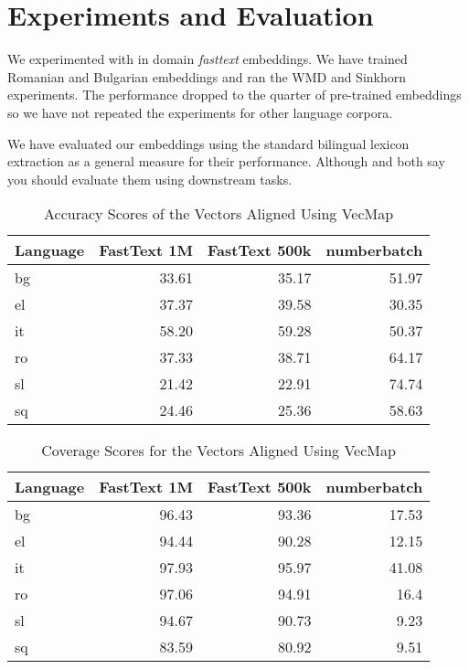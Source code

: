 
\chapter{Experiments and Evaluation}%
\label{chap:experiments_and_evaluation}

We experimented with in domain \emph{fasttext} embeddings.
We have trained Romanian and Bulgarian embeddings and ran the WMD and Sinkhorn experiments.
The performance dropped to the quarter of pre-trained embeddings so we have not repeated the experiments for other language corpora.

We have evaluated our embeddings using the standard bilingual lexicon extraction as a general measure for their performance.
Although \textcite{ruder_survey_2017} and \textcite{glavas_how_2019} both say you should evaluate them using downstream tasks.

\begin{table}[htbp]
    \centering
    \begin{tabular}{lrrr}
        \toprule
        \textbf{Language} & \textbf{FastText 1M} & \textbf{FastText 500k} & \textbf{numberbatch} \\
        \midrule
        bg & 33.61 & 35.17 & 51.97 \\
        el & 37.37 & 39.58 & 30.35 \\
        it & 58.20 & 59.28 & 50.37 \\
        ro & 37.33 & 38.71 & 64.17 \\
        sl & 21.42 & 22.91 & 74.74 \\
        sq & 24.46 & 25.36 & 58.63 \\
        \bottomrule
    \end{tabular}
    \caption{Accuracy Scores of the Vectors Aligned Using VecMap}%
    \label{tab:accuracy_results}
\end{table}

\begin{table}[htbp]
    \centering
    \begin{tabular}{lrrr}
        \toprule
        \textbf{Language} & \textbf{FastText 1M} & \textbf{FastText 500k} & \textbf{numberbatch} \\
        \midrule
        bg & 96.43 & 93.36 & 17.53 \\
        el & 94.44 & 90.28 & 12.15 \\
        it & 97.93 & 95.97 & 41.08 \\
        ro & 97.06 & 94.91 & 16.4 \\
        sl & 94.67 & 90.73 & 9.23 \\
        sq & 83.59 & 80.92 & 9.51 \\
        \bottomrule
    \end{tabular}
    \caption{Coverage Scores for the Vectors Aligned Using VecMap}%
    \label{tab:coverage_results}
\end{table}


